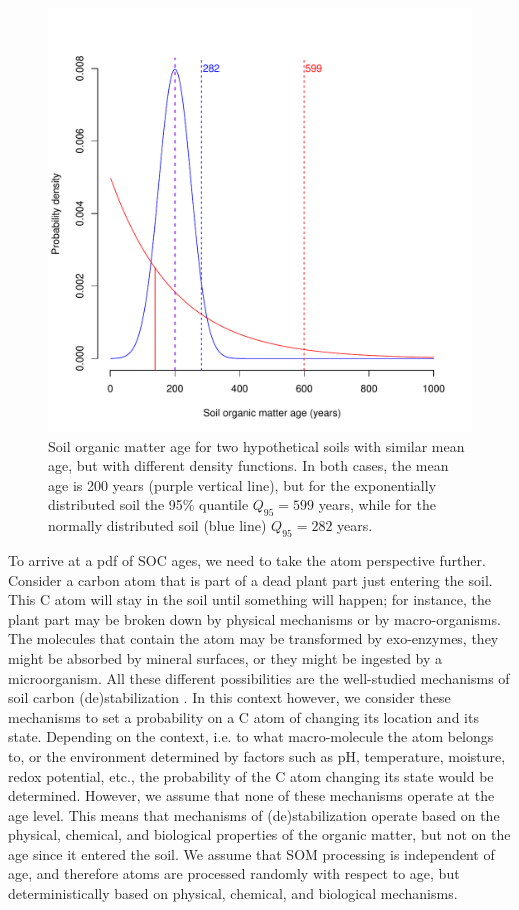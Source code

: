 \documentclass[draft,linenumbers]{agujournal}
\begin{document}
\begin{figure}[t]
   \centering
   \includegraphics[scale=0.75]{Figures/example} %
   \caption{Soil organic matter age for two hypothetical soils with similar mean age, but with different density functions. In both cases, the mean age is 200 years (purple vertical line), but for the exponentially distributed soil the 95\% quantile $Q_{95} = 599$ years, while for the normally distributed soil (blue line) $Q_{95} = 282$ years.}
   \label{fig:example}
\end{figure}

To arrive at a pdf of SOC ages, we need to take the atom perspective further. Consider a carbon atom that is part of a dead plant part just entering the soil. This C atom will stay in the soil until something will happen; for instance, the plant part may be broken down by physical mechanisms or by macro-organisms. The molecules that contain the atom may be transformed by exo-enzymes, they might be absorbed by mineral surfaces, or they might be ingested by a microorganism. All these different possibilities are the well-studied mechanisms of soil carbon (de)stabilization \citep{Sollins1996, vonLutzow2008, Schmidt2011, LehmannKleber}. In this context however, we consider these mechanisms to set a probability on a C atom of changing its location and its state. Depending on the context, i.e. to what macro-molecule the atom belongs to, or the environment determined by factors such as pH, temperature, moisture, redox potential, etc., the probability of the C atom changing its state would be determined. However, we assume that none of these mechanisms operate at the age level. This means that mechanisms of (de)stabilization operate based on the physical, chemical, and biological properties of the organic matter, but not on the age since it entered the soil. We assume that SOM processing is independent of age, and therefore atoms are processed randomly with respect to age, but deterministically based on physical, chemical, and biological mechanisms. 
\end{document}
